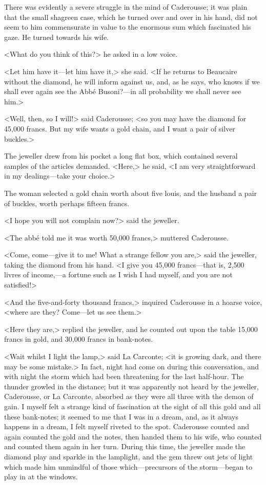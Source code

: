 {There was evidently a severe struggle in the mind of Caderousse; it was plain that the small shagreen case, which he turned over and over in his hand, did not seem to him commensurate in value to the enormous sum which fascinated his gaze. He turned towards his wife. 

<What do you think of this?> he asked in a low voice. 

<Let him have it—let him have it,> she said. <If he returns to Beaucaire without the diamond, he will inform against us, and, as he says, who knows if we shall ever again see the Abbé Busoni?—in all probability we shall never see him.> 

<Well, then, so I will!> said Caderousse; <so you may have the diamond for 45,000 francs. But my wife wants a gold chain, and I want a pair of silver buckles.> 

The jeweller drew from his pocket a long flat box, which contained several samples of the articles demanded. <Here,> he said, <I am very straightforward in my dealings—take your choice.> 

The woman selected a gold chain worth about five louis, and the husband a pair of buckles, worth perhaps fifteen francs. 

<I hope you will not complain now?> said the jeweller. 

<The abbé told me it was worth 50,000 francs,> muttered Caderousse. 

<Come, come—give it to me! What a strange fellow you are,> said the jeweller, taking the diamond from his hand. <I give you 45,000 francs—that is, 2,500 livres of income,—a fortune such as I wish I had myself, and you are not satisfied!> 

<And the five-and-forty thousand francs,> inquired Caderousse in a hoarse voice, <where are they? Come—let us see them.> 

<Here they are,> replied the jeweller, and he counted out upon the table 15,000 francs in gold, and 30,000 francs in bank-notes. 

<Wait whilst I light the lamp,> said La Carconte; <it is growing dark, and there may be some mistake.> In fact, night had come on during this conversation, and with night the storm which had been threatening for the last half-hour. The thunder growled in the distance; but it was apparently not heard by the jeweller, Caderousse, or La Carconte, absorbed as they were all three with the demon of gain. I myself felt a strange kind of fascination at the sight of all this gold and all these bank-notes; it seemed to me that I was in a dream, and, as it always happens in a dream, I felt myself riveted to the spot. Caderousse counted and again counted the gold and the notes, then handed them to his wife, who counted and counted them again in her turn. During this time, the jeweller made the diamond play and sparkle in the lamplight, and the gem threw out jets of light which made him unmindful of those which—precursors of the storm—began to play in at the windows. 

}
